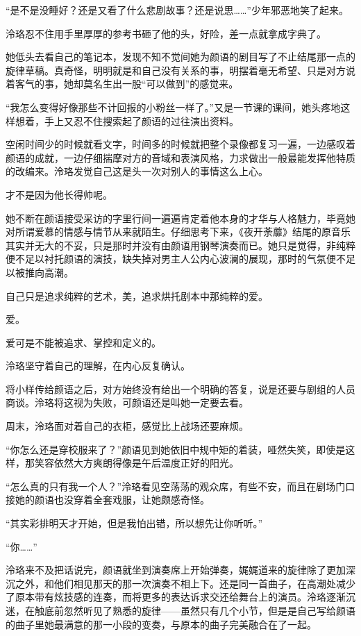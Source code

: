 \documentclass[UTF8, scheme = chinese, openany]{ctexbook}
\begin{document}
“是不是没睡好？还是又看了什么悲剧故事？还是说思……”少年邪恶地笑了起来。

泠珞忍不住用手里厚厚的参考书砸了他的头，好险，差一点就拿成字典了。

她低头去看自己的笔记本，发现不知不觉间她为颜语的剧目写了不止结尾那一点的旋律草稿。真奇怪，明明就是和自己没有关系的事，明摆着毫无希望、只是对方说着客气的事，她却莫名生出一股“可以做到”的感觉来。

“我怎么变得好像那些不计回报的小粉丝一样了。”又是一节课的课间，她头疼地这样想着，手上又忍不住搜索起了颜语的过往演出资料。

空闲时间少的时候就看文字，时间多的时候就把整个录像都复习一遍，一边感叹着颜语的成就，一边仔细揣摩对方的音域和表演风格，力求做出一般最能发挥他特质的改编来。泠珞发觉自己这是头一次对别人的事情这么上心。

才不是因为他长得帅呢。

她不断在颜语接受采访的字里行间一遍遍肯定着他本身的才华与人格魅力，毕竟她对所谓爱慕的情感与情节从来就陌生。仔细思考下来，《夜开荼蘼》结尾的原音乐其实并无大的不妥，只是那时并没有由颜语用钢琴演奏而已。她只是觉得，非纯粹便不足以衬托颜语的演技，缺失掉对男主人公内心波澜的展现，那时的气氛便不足以被推向高潮。

自己只是追求纯粹的艺术，美，追求烘托剧本中那纯粹的爱。

爱。

爱可是不能被追求、掌控和定义的。

泠珞坚守着自己的理解，在内心反复确认。

将小样传给颜语之后，对方始终没有给出一个明确的答复，说是还要与剧组的人员商谈。泠珞将这视为失败，可颜语还是叫她一定要去看。

周末，泠珞面对着自己的衣柜，感觉比上战场还要麻烦。

“你怎么还是穿校服来了？”颜语见到她依旧中规中矩的着装，哑然失笑，即使是这样，那笑容依然大方爽朗得像是午后温度正好的阳光。

“怎么真的只有我一个人？”泠珞看见空荡荡的观众席，有些不安，而且在剧场门口接她的颜语也没穿着全套戏服，让她颇感奇怪。

“其实彩排明天才开始，但是我怕出错，所以想先让你听听。”

“你……”

泠珞来不及把话说完，颜语就坐到演奏席上开始弹奏，娓娓道来的旋律除了更加深沉之外，和他们相见那天的那一次演奏不相上下。还是同一首曲子，在高潮处减少了原本带有炫技感的连奏，而将更多的表达诉求交还给舞台上的演员。泠珞逐渐沉迷，在触底前忽然听见了熟悉的旋律——虽然只有几个小节，但是是自己写给颜语的曲子里她最满意的那一小段的变奏，与原本的曲子完美融合在了一起。
\end{document}
